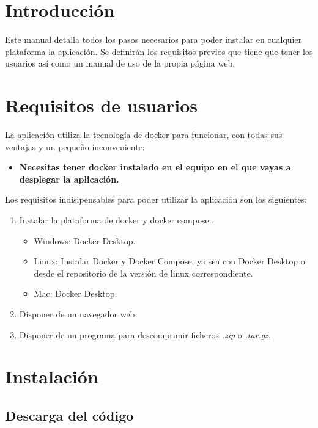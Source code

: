 
\section{Introducción}

Este manual detalla todos los pasos necesarios para poder instalar en cualquier plataforma la aplicación. Se definirán los requisitos previos que tiene que tener los usuarios así como un manual de uso de la propia página web.

\section{Requisitos de usuarios}

La aplicación utiliza la tecnología de docker para funcionar, con todas sus ventajas y un pequeño inconveniente:

\begin{itemize}
	\item \textbf{Necesitas tener docker instalado en el equipo en el que vayas a desplegar la aplicación.}
\end{itemize}

Los requisitos indisipensables para poder utilizar la aplicación son los siguientes:

\begin{enumerate}
	\item Instalar la plataforma de docker \cite{web:dockerDesktop} y docker compose \cite{web:dockercompose}.
	\begin{itemize}
		\item Windows: Docker Desktop.
		\item Linux: Instalar Docker y Docker Compose, ya sea con Docker Desktop o desde el repositorio de la versión de linux correspondiente.
		\item Mac: Docker Desktop.
	\end{itemize}
	\item Disponer de un navegador web.
	\item Disponer de un programa para descomprimir ficheros \textit{.zip} o \textit{.tar.gz}.
\end{enumerate}

\section{Instalación}

\subsection{Descarga del código}

